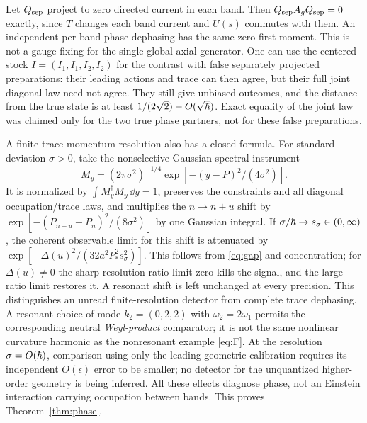 Let \(Q_{\rm sep}\) project to zero directed current in each band. Then \(Q_{\rm sep}A_gQ_{\rm sep}=0\) exactly, since \(T\) changes each band current and \(U(s)\) commutes with them. An independent per-band phase dephasing has the same zero first moment. This is not a gauge fixing for the single global axial generator. One can use the centered stock \(I=(I_1,I_1,I_2,I_2)\) for the contrast with false separately projected preparations: their leading actions and trace can then agree, but their full joint diagonal law need not agree. They still give unbiased outcomes, and the distance from the true state is at least \(1/(2\sqrt2)-O(\sqrt{\hbar})\). Exact equality of the joint law was claimed only for the two true phase partners, not for these false preparations.

A finite trace-momentum resolution also has a closed formula. For standard deviation \(\sigma>0\), take the nonselective Gaussian spectral instrument
\[
        M_y=(2\pi\sigma^2)^{-1/4}
                        \exp[-(y-P)^2/(4\sigma^2)] .
\]
It is normalized by \(\int M_y^\dagger M_y\,\dd y=1\), preserves the constraints and all diagonal occupation/trace laws, and multiplies the \(n\to n+u\) shift by
\(\exp[-(P_{n+u}-P_n)^2/(8\sigma^2)]\) by one Gaussian integral. If \(\sigma/\hbar\to s_\sigma\in(0,\infty)\), the coherent observable limit for this shift is attenuated by
\(\exp[-\Delta(u)^2/(32 a^2 P_*^2 s_\sigma^2)]\). This follows from \eqref{eq:gap} and concentration; for \(\Delta(u)\ne0\) the sharp-resolution ratio limit zero kills the signal, and the large-ratio limit restores it. A resonant shift is left unchanged at every precision. This distinguishes an unread finite-resolution detector from complete trace dephasing. A resonant choice of mode \(k_2=(0,2,2)\) with \(\omega_2=2\omega_1\) permits the corresponding neutral \emph{Weyl-product} comparator; it is not the same nonlinear curvature harmonic as the nonresonant example \eqref{eq:F}. At the resolution \(\sigma=O(\hbar)\), comparison using only the leading geometric calibration requires its independent \(O(\epsilon)\) error to be smaller; no detector for the unquantized higher-order geometry is being inferred. All these effects diagnose phase, not an Einstein interaction carrying occupation between bands. This proves Theorem~\ref{thm:phase}.

